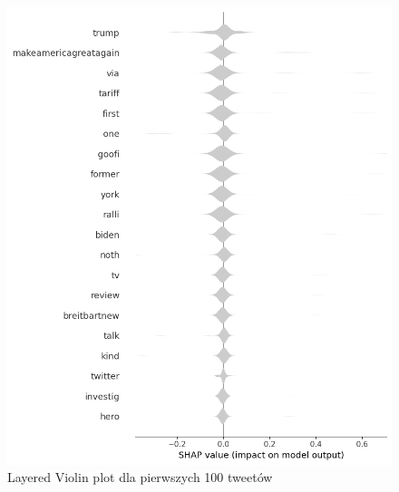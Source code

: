 \documentclass{article}
\begin{document}
\begin{figure}[H]
    \centering
    \includegraphics[width=\textwidth]{assets/layered_violin.png}
    \caption{Layered Violin plot dla pierwszych 100 tweetów}
\end{figure}
\end{document}
